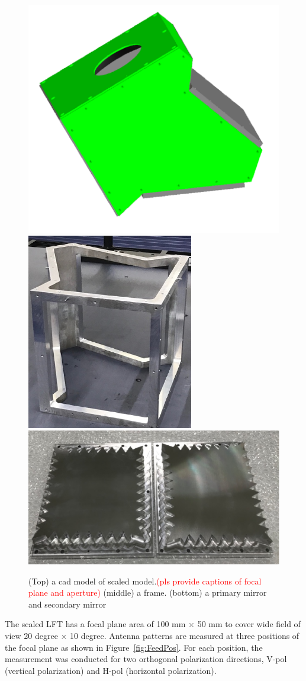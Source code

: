 \documentclass[journal]{IEEEtran}
\newcommand{\red}[1]{\textcolor{red}{#1}}
\begin{document}
\begin{figure}
\centering
\includegraphics[width=0.6\linewidth]{Figures/cad1.pdf}
\includegraphics[width=0.6\linewidth]{Figures/frame.pdf}
\includegraphics[width=0.6\linewidth]{Figures/mirrors.pdf}
\caption{(Top) a cad model of scaled model.\red{(pls provide captions of focal plane and aperture)} (middle) a frame. (bottom) a primary mirror and secondary mirror }
\label{fig:cad-frame-mirrors}
\end{figure}
\par
The scaled LFT has a focal plane area of 100 mm $\times$ 50 mm to cover wide field of view 20 degree $\times$ 10 degree.  
Antenna patterns are measured at three positions of the focal plane as shown in Figure~\ref{fig:FeedPos}. For each position, the measurement was conducted for two orthogonal polarization directions, V-pol (vertical polarization) and H-pol (horizontal polarization).
%
%
\end{document}
